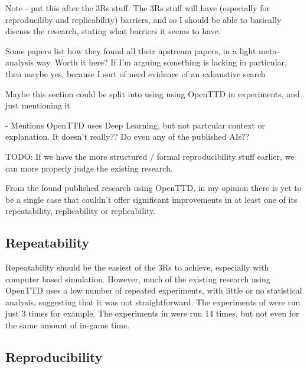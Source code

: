 \documentclass[logo,msc,dsti]{infthesis}    %
\begin{document}
Note - put this after the 3Rs stuff. The 3Rs stuff will have (especially for reproduciliby and replicability) barriers, and so I should be able to basically discuss the research, stating what barriers it seems to have.

\begin{itemize}
\begin{item}
Some papers list how they found all their upstream papers, in a light meta-analysis way. Worth it here? If I'm arguing something is lacking in particular, then maybe yes, because I sort of need evidence of an exhaustive search
\end{item}
\begin{item} Maybe this section could be split into using using OpenTTD in experiments, and just mentioning it
\end{item}
\begin{item}
\cite{fenjiro2018deep} - Mentions OpenTTD uses Deep Learning, but not partcular context or explanation. It doesn't really?? Do even any of the published AIs??
\end{item}
\end{itemize}

TODO: If we have the more structured / formal reproducibility stuff earlier, we can more properly judge the existing research.

From the found published research using OpenTTD, in my opinion there is yet to be a single case that couldn't offer significant improvements in at least one of its repeatability, replicability or replicability.

\subsection{Repeatability}

Repeatability should be the easiest of the 3Rs to achieve, especially with computer based simulation. However, much of the existing research using OpenTTD uses a low number of repeated experiments, with little or no statistical analysis, suggesting that it was not straightforward. The experiments of \cite{wisniewski2011artificial} were run just 3 times for example. The experiments in \cite{rios2009trains} were run 14 times, but not even for the same amount of in-game time.

\subsection{Reproducibility}
\end{document}
